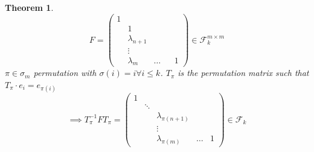 \documentclass[a4paper,landscape,twocolumn]{article}
\newtheorem{theorem}{Theorem}[section]
\begin{document}
\begin{theorem}
  \label{lemma-6.50}
  \[
    F = \begin{pmatrix}
      1 &   & & & \\
        & 1 & & & \\
        & \lambda_{n+1} & & & \\
        & \vdots & & & \\
        & \lambda_{m} & \ldots & & 1
    \end{pmatrix}
    \in {\mathcal F}_k^{m\times m}
  \]
  $\pi \in \sigma_m$ permutation with $\sigma(i) = i \forall i \leq k$.
  $T_\pi$ is the permutation matrix such that $T_\pi \cdot e_i = e_{\pi(i)}$
  \[
    \implies T_\pi^{-1} F T_\pi = \begin{pmatrix}
      1 & & & & \\
        & \ddots &  & & \\
        & & \lambda_{\pi(n+1)} & & \\
        & & \vdots & & \\
        & & \lambda_{\pi(m)} & \ldots & 1
    \end{pmatrix}
    \in {\mathcal F}_k
  \]
\end{theorem}
\end{document}
